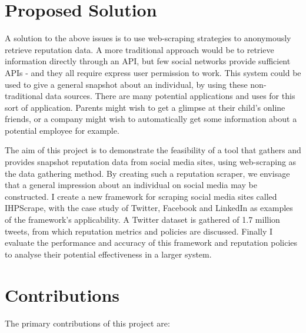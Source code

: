 % 
% 

\section{Proposed Solution}
A solution to the above issues is to use web-scraping strategies to anonymously retrieve reputation data. A more traditional approach would be to retrieve information directly through an API, but few social networks provide sufficient APIs - and they all require express user permission to work. This system could be used to give a general snapshot about an individual, by using these non-traditional data sources. There are many potential applications and uses for this sort of application. Parents might wish to get a glimpse at their child's online friends, or a company might wish to automatically get some information about a potential employee for example.

The aim of this project is to demonstrate the feasibility of a tool that gathers and provides snapshot reputation data from social media sites, using web-scraping as the data gathering method. By creating such a reputation scraper, we envisage that a general impression about an individual on social media may be constructed. I create a new framework for scraping social media sites called IHPScrape, with the case study of Twitter, Facebook and LinkedIn as examples of the framework's applicability. A Twitter dataset is gathered of 1.7 million tweets, from which reputation metrics and policies are discussed. Finally I evaluate the performance and accuracy of this framework and reputation policies to analyse their potential effectiveness in a larger system.

\section{Contributions}
The primary contributions of this project are:

